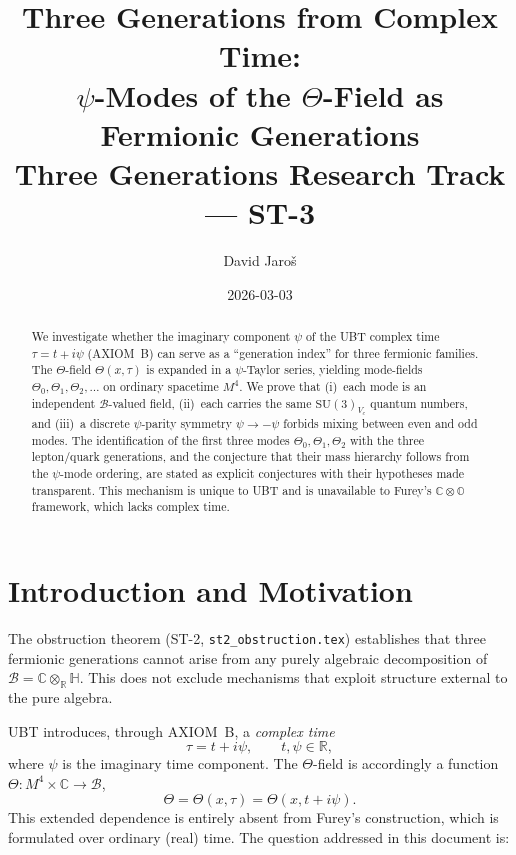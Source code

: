 \documentclass[12pt,a4paper]{article}
\title{%
  Three Generations from Complex Time:\\
  $\psi$-Modes of the $\Theta$-Field as Fermionic Generations\\
  \large Three Generations Research Track --- ST-3
}
\author{David Jaro\v{s}}
\date{2026-03-03}
\theoremstyle{remark}
\begin{document}
\maketitle

\begin{abstract}
We investigate whether the imaginary component $\psi$ of the UBT complex time
$\tau = t + i\psi$ (AXIOM~B) can serve as a ``generation index'' for three
fermionic families.  The $\Theta$-field $\Theta(x,\tau)$ is expanded in a
$\psi$-Taylor series, yielding mode-fields $\Theta_0, \Theta_1, \Theta_2,\ldots$
on ordinary spacetime $M^4$.  We prove that (i)~each mode is an independent
$\mathcal{B}$-valued field, (ii)~each carries the same $\mathrm{SU}(3)_{V_c}$
quantum numbers, and (iii)~a discrete $\psi$-parity symmetry $\psi \to -\psi$
forbids mixing between even and odd modes.  The identification of the first
three modes $\Theta_0, \Theta_1, \Theta_2$ with the three lepton/quark
generations, and the conjecture that their mass hierarchy follows from the
$\psi$-mode ordering, are stated as explicit conjectures with their hypotheses
made transparent.  This mechanism is unique to UBT and is unavailable to
Furey's $\mathbb{C}\otimes\mathbb{O}$ framework, which lacks complex time.
\end{abstract}

\tableofcontents

\section{Introduction and Motivation}
\label{sec:intro}

The obstruction theorem (ST-2, \texttt{st2\_obstruction.tex}) establishes that
three fermionic generations cannot arise from any purely algebraic decomposition
of $\mathcal{B} = \mathbb{C}\otimes_\mathbb{R}\mathbb{H}$.  This does not
exclude mechanisms that exploit structure external to the pure algebra.

UBT introduces, through AXIOM~B, a \emph{complex time}
\[
  \tau = t + i\psi, \qquad t, \psi \in \mathbb{R},
\]
where $\psi$ is the imaginary time component.  The $\Theta$-field is accordingly
a function $\Theta : M^4 \times \mathbb{C} \to \mathcal{B}$,
\[
  \Theta = \Theta(x, \tau) = \Theta(x, t+i\psi).
\]
This extended dependence is entirely absent from Furey's construction, which
is formulated over ordinary (real) time.  The question addressed in this
document is:
\end{document}
